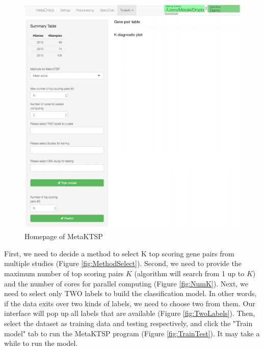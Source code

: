 \documentclass{article}
\begin{document}
\begin{figure}[H]
\begin{center}
\includegraphics[scale=0.7]{./figure/MetaKTSP/Figure4.pdf}
\caption{Homepage of MetaKTSP}
\label{fig:MetaKTSPmainpage}
\end{center}
\end{figure}

First, we need to decide a method to select K top scoring gene pairs from multiple studies (Figure \ref{fig:MethodSelect}). Second, we need to provide the maximum number of top scoring pairs $K$ (algorithm will search from 1 up to $K$) and the number of cores for parallel computing (Figure \ref{fig:NumK}). Next, we need to select only TWO labels to build the classification model. In other words, if the data exits over two kinds of labels, we need to choose two from them. Our interface will pop up all labels that are available (Figure \ref{fig:TwoLabels}). Then, select the dataset as training data and testing respectively, and click the "Train model" tab to run the MetaKTSP program  (Figure \ref{fig:TrainTest}). It may take a while to run the model.
\end{document}
